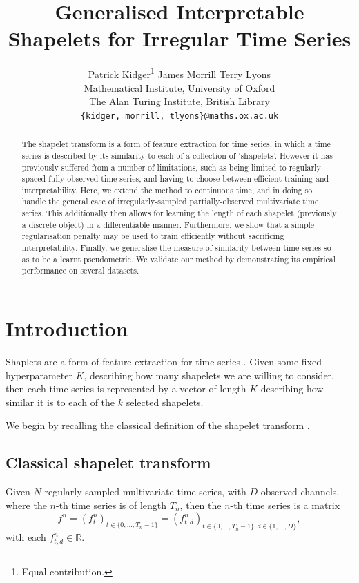 \documentclass{article}
\title{Generalised Interpretable Shapelets for Irregular Time Series}
\author{ 
	Patrick Kidger\thanks{Equal contribution.}
	\And
	James Morrill\footnotemark[1]
	\And
	Terry Lyons
	\AND \\[-12pt]
	Mathematical Institute, University of Oxford \\
	The Alan Turing Institute, British Library \\
	\texttt{\{kidger, morrill, tlyons\}@\hspace{0.8pt}maths.ox.ac.uk}
}
\theoremstyle{plain}
\theoremstyle{definition}
\newcommand{\reals}{\mathbb{R}}
\begin{document}
	\maketitle
	\begin{abstract}
		The shapelet transform is a form of feature extraction for time series, in which a time series is described by its similarity to each of a collection of `shapelets'. However it has previously suffered from a number of limitations, such as being limited to regularly-spaced fully-observed time series, and having to choose between efficient training and interpretability. Here, we extend the method to continuous time, and in doing so handle the general case of irregularly-sampled partially-observed multivariate time series. This additionally then allows for learning the length of each shapelet (previously a discrete object) in a differentiable manner. Furthermore, we show that a simple regularisation penalty may be used to train efficiently without sacrificing interpretability. Finally, we generalise the measure of similarity between time series so as to be a learnt pseudometric. We validate our method by demonstrating its empirical performance on several datasets.
	\end{abstract}
	\section{Introduction}
	Shaplets are a form of feature extraction for time series \cite{ye2009firstshapelet, grabocka2014learningshapelet, hou2016efficient, bagnall2016bakeoff}. Given some fixed hyperparameter $K$, describing how many shapelets we are willing to consider, then each time series is represented by a vector of length $K$ describing how similar it is to each of the $k$ selected shapelets.
	
	We begin by recalling the classical definition of the shapelet transform \cite{hills2014classification}.
	\subsection{Classical shapelet transform}\label{section:classical-introduction}
	Given $N$ regularly sampled multivariate time series, with $D$ observed channels, where the $n$-th time series is of length $T_n$, then the $n$-th time series is a matrix 
	\begin{equation}\label{eq:f-n}
	f^n = (f^n_{t})_{t \in \{0, \ldots, T_n - 1\}} = (f^n_{t, d})_{t \in \{0, \ldots, T_n - 1\}, d \in \{1, \ldots, D\}},
	\end{equation}
	with each $f^n_{t, d} \in \reals$.%
	
\end{document}
